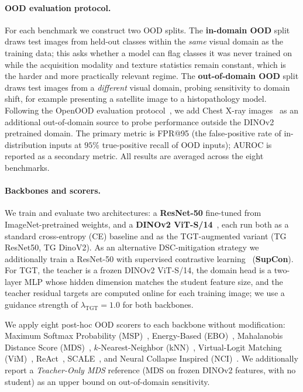 \paragraph{OOD evaluation protocol.}
For each benchmark we construct two OOD splits. The \textbf{in-domain OOD} split draws test images from held-out classes within the \emph{same} visual domain as the training data; this asks whether a model can flag classes it was never trained on while the acquisition modality and texture statistics remain constant, which is the harder and more practically relevant regime. The \textbf{out-of-domain OOD} split draws test images from a \emph{different} visual domain, probing sensitivity to domain shift, for example presenting a satellite image to a histopathology model. Following the OpenOOD evaluation protocol~\citep{yang2022openood}, we add Chest X-ray images~\citep{yang2023medmnist} as an additional out-of-domain source to probe performance outside the DINOv2 pretrained domain. The primary metric is FPR@95 (the false-positive rate of in-distribution inputs at $95\%$ true-positive recall of OOD inputs); AUROC is reported as a secondary metric. All results are averaged across the eight benchmarks.

\paragraph{Backbones and scorers.}
We train and evaluate two architectures: a \textbf{ResNet-50} fine-tuned from ImageNet-pretrained weights, and a \textbf{DINOv2 ViT-S/14}~\citep{oquab2023dinov2}, each run both as a standard cross-entropy (CE) baseline and as the TGT-augmented variant (TG ResNet50, TG DinoV2). As an alternative DSC-mitigation strategy we additionally train a ResNet-50 with supervised contrastive learning~\citep{khosla2020supervised} (\textbf{SupCon}). For TGT, the teacher is a frozen DINOv2 ViT-S/14, the domain head is a two-layer MLP whose hidden dimension matches the student feature size, and the teacher residual targets are computed online for each training image; we use a guidance strength of $\lambda_{\mathrm{TGT}}=1.0$ for both backbones.

We apply eight post-hoc OOD scorers to each backbone without modification: Maximum Softmax Probability (MSP)~\citep{hendrycks2016baseline}, Energy-Based (EBO)~\citep{liu2020energy}, Mahalanobis Distance Score (MDS)~\citep{lee2018simple}, $k$-Nearest-Neighbor (kNN)~\citep{sun2022out}, Virtual-Logit Matching (ViM)~\citep{Wang2022vim}, ReAct~\citep{sun2021react}, SCALE~\citep{xuscaling}, and Neural Collapse Inspired (NCI)~\citep{liu2025detecting}. We additionally report a \emph{Teacher-Only MDS} reference (MDS on frozen DINOv2 features, with no student) as an upper bound on out-of-domain sensitivity.

